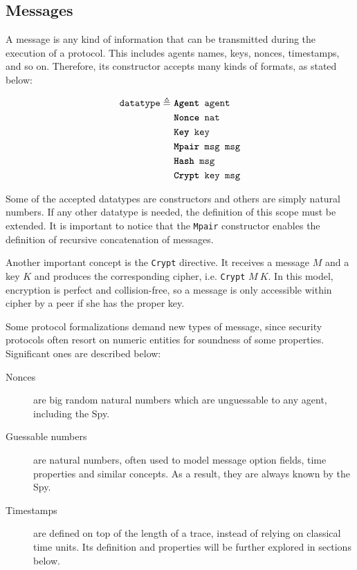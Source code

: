 \subsection{Messages}
A message is any kind of information that can be transmitted during the execution of a protocol. This includes agents names, keys, nonces, timestamps, and so on. Therefore, its constructor accepts many kinds of formats, as stated below:

\begin{equation*}
  \begin{split}
    \texttt{datatype} \triangleq\
    & \texttt{\textbf{Agent} agent} \\
    & \texttt{\textbf{Nonce} nat} \\
    & \texttt{\textbf{Key} key} \\
    & \texttt{\textbf{Mpair} msg msg} \\
    & \texttt{\textbf{Hash} msg} \\
    & \texttt{\textbf{Crypt} key msg}
  \end{split}
\end{equation*}

Some of the accepted datatypes are constructors and others are simply natural numbers. If any other datatype is needed, the definition of this scope must be extended. It is important to notice that the \texttt{Mpair} constructor enables the definition of recursive concatenation of messages.

Another important concept is the \texttt{Crypt} directive. It receives a message $M$ and a key $K$ and produces the corresponding cipher, i.e. \texttt{Crypt} $M\ K$. In this model, encryption is perfect and collision-free, so a message is only accessible within cipher by a peer if she has the proper key.

Some protocol formalizations demand new types of message, since security protocols often resort on numeric entities for soundness of some properties. Significant ones are described below:

\begin{description}
  \item[Nonces] are big random natural numbers which are unguessable to any agent, including the Spy.

  \item[Guessable numbers] are natural numbers, often used to model message option fields, time properties and similar concepts. As a result, they are always known by the Spy.

  \item[Timestamps] are defined on top of the length of a trace, instead of relying on classical time units. Its definition and properties will be further explored in sections below.
\end{description}



